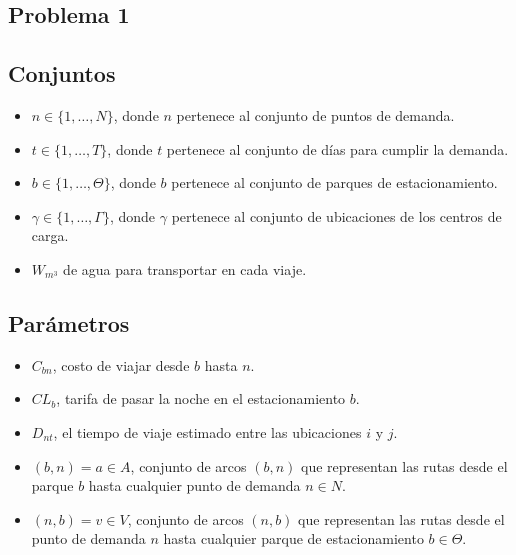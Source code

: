 \documentclass[addpoints,10pt]{exam}
\begin{document}
	
	\begin{flushleft}
		
		\section{Problema 1}
		\subsection{Conjuntos}
		\begin{itemize}
			\item $n \in \{1, \ldots, N\}$, donde $n$ pertenece al conjunto de puntos de demanda.
			\item $t \in \{1, \ldots, T\}$, donde $t$ pertenece al conjunto de d\'ias para cumplir la demanda.
			\item $b \in \{1, \ldots, \Theta\}$, donde $b$ pertenece al conjunto de parques de estacionamiento.
			\item $\gamma \in \{1, \ldots, \Gamma\}$, donde $\gamma$ pertenece al conjunto de ubicaciones de los centros de carga.
			\item $W_{m^3}$ de agua para transportar en cada viaje.
		\end{itemize}

		\subsection{Parámetros}
		\begin{itemize}
			\item $C_{bn}$, costo de viajar desde $b$ hasta $n$.
			\item $CL_b$, tarifa de pasar la noche en el estacionamiento $b$.
			\item $D_{nt}$, el tiempo de viaje estimado entre las ubicaciones $i$ y $j$.
			\item $(b, n) = a \in A$, conjunto de arcos $(b, n)$ que representan las rutas desde el parque $b$ hasta cualquier punto de demanda $n \in N$.
			\item $(n, b) = v \in V$, conjunto de arcos $(n, b)$ que representan las rutas desde el punto de demanda $n$ hasta cualquier parque de estacionamiento $b \in \Theta$.
		\end{itemize}


\end{flushleft}
\end{document}
